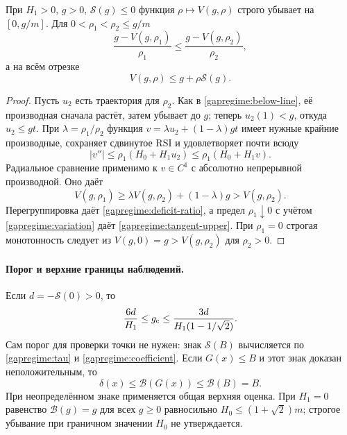 \begin{corollary}
\label{gapregime:radius-monotone}
При $H_1>0$, $g>0$, $\mathcal S(g)\le0$ функция
$\rho\mapsto V(g,\rho)$ строго убывает на $[0,g/m]$.
Для $0<\rho_1<\rho_2\le g/m$
\begin{equation}\label{gapregime:deficit-ratio}
 \frac{g-V(g,\rho_1)}{\rho_1}
 \le\frac{g-V(g,\rho_2)}{\rho_2},
\end{equation}
а на всём отрезке
\begin{equation}\label{gapregime:tangent-upper}
 V(g,\rho)\le g+\rho\mathcal S(g).
\end{equation}
\end{corollary}
\begin{proof}
Пусть $u_2$ есть траектория для $\rho_2$.
Как в \eqref{gapregime:below-line}, её производная сначала растёт,
затем убывает до $g$; теперь $u_2(1)<g$, откуда $u_2\le gt$.
При $\lambda=\rho_1/\rho_2$ функция
$v=\lambda u_2+(1-\lambda)gt$ имеет нужные крайние производные,
сохраняет сдвинутое RSI и удовлетворяет почти всюду
\[
 |v''|\le\rho_1(H_0+H_1u_2)\le\rho_1(H_0+H_1v).
\]
Радиальное сравнение применимо к $v\in C^1$ с абсолютно
непрерывной производной. Оно даёт
\begin{equation}\label{gapregime:mixture}
 V(g,\rho_1)\ge\lambda V(g,\rho_2)+(1-\lambda)g>V(g,\rho_2).
\end{equation}
Перегруппировка даёт \eqref{gapregime:deficit-ratio},
а предел $\rho_1\downarrow0$ с учётом
\eqref{gapregime:variation} даёт \eqref{gapregime:tangent-upper}.
При $\rho_1=0$ строгая монотонность следует из
$V(g,0)=g>V(g,\rho_2)$ для $\rho_2>0$.
\end{proof}

\paragraph{Порог и верхние границы наблюдений.}
Если $d=-\mathcal S(0)>0$, то
\begin{equation}\label{gapregime:threshold-bracket}
 \frac{6d}{H_1}\le g_{\rm c}
 \le\frac{3d}{H_1(1-1/\sqrt2)}.
\end{equation}
Сам порог для проверки точки не нужен: знак $\mathcal S(B)$
вычисляется по \eqref{gapregime:tau} и \eqref{gapregime:coefficient}.
Если $G(x)\le B$ и этот знак доказан неположительным, то
\begin{equation}\label{gapregime:inexact}
 \delta(x)\le\mathcal B(G(x))\le\mathcal B(B)=B.
\end{equation}
При неопределённом знаке применяется общая верхняя оценка.
При $H_1=0$ равенство $\mathcal B(g)=g$ для всех $g\ge0$
равносильно $H_0\le(1+\sqrt2)m$; строгое убывание при граничном
значении $H_0$ не утверждается.

